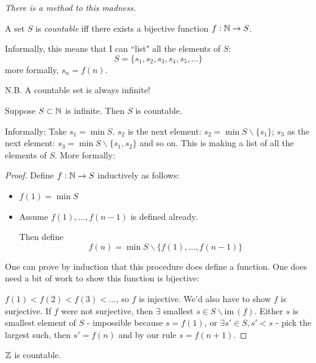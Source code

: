 \documentclass[10pt]{scrartcl}
\begin{document}
\emph{There is a method to this madness.} 


\vspace*{5pt}

\begin{definition}
A set $S$ is \emph{countable} iff there exists a bijective function $f: \mathbb{N} \to S$. 	
\end{definition}\vspace*{5pt}

Informally, this means that I can ``list" all the elements of $S$: 
\[S = \{s_1,s_2,s_3,s_4,s_5,\dots\}\]
more formally, $s_n = f(n)$. 

N.B. A countable set is always infinite! \vspace*{5pt}


\begin{proposition}
Suppose $S \subset \mathbb{N}$ is infinite. Then $S$ is countable. 	
\end{proposition}

Informally: Take $s_1 = \min S$. $s_2$ is the next element: $s_2 = \min S \backslash\{s_1\}$; $s_3$ as the next element: $s_3 = \min S \backslash\{s_1,s_2\}$ and so on. This is making a list of all the elements of $S$. More formally:

\begin{proof}
	Define $f: \mathbb{N} \to S$ inductively as follows: 
	\begin{itemize}
	\item $f(1) = \min S$
	\item Assume $f(1),\dots, f(n-1)$ is defined already. 
	
	Then define 
	\[f(n) = \min S \backslash \{f(1),\dots,f(n-1)\}\]	
	\end{itemize}
	One can prove by induction that this procedure does define a function. One does need a bit of work to show this function is bijective: 
	
	$f(1) < f(2) < f(3) < \dots$, so $f$ is injective. We'd also have to show $f$ is surjective. If $f$ were not surjective, then $\exists$ smallest $s \in S \backslash \mathrm{im}\,(f)$. Either $s$ is smallest element of $S$ - impossible because $s = f(1)$, or $\exists s' \in S, s' < s$ - pick the largest such, then $s' = f(n)$ and by our rule $s = f(n+1)$. 
\end{proof}\vsp


\begin{proposition} {\normalfont{}}
$\mathbb{Z}$ is countable. 
\end{proposition}
\end{document}
